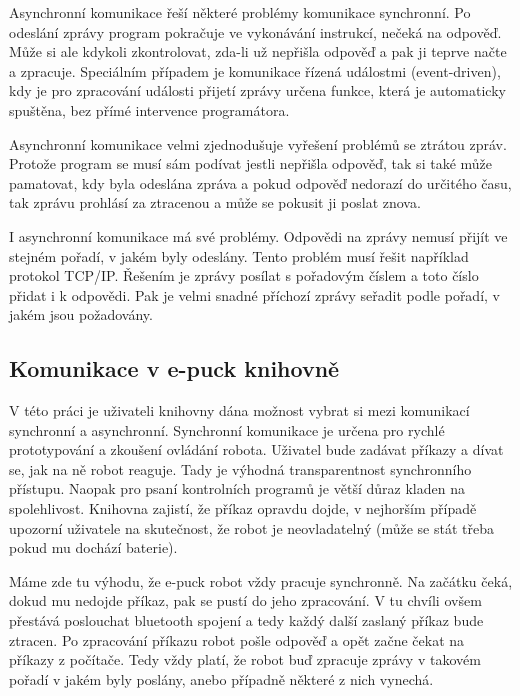 \documentclass[12pt,notitlepage]{report}
\begin{document}
    Asynchronní komunikace řeší některé problémy komunikace synchronní. Po
    odeslání zprávy program pokračuje ve vykonávání instrukcí, nečeká na
    odpověď. Může si ale kdykoli zkontrolovat, zda-li už nepřišla odpověď a pak
    ji teprve načte a zpracuje. Speciálním případem je komunikace řízená
    událostmi (event-driven), kdy je pro zpracování události přijetí zprávy
    určena funkce, která je automaticky spuštěna, bez přímé intervence
    programátora.

    Asynchronní komunikace velmi zjednodušuje vyřešení problémů se ztrátou
    zpráv. Protože program se musí sám podívat jestli nepřišla odpověď, tak si
    také může pamatovat, kdy byla odeslána zpráva a pokud odpověď nedorazí do
    určitého času, tak zprávu prohlásí za ztracenou a může se pokusit ji poslat
    znova.

    I asynchronní komunikace má své problémy. Odpovědi na zprávy nemusí přijít
    ve stejném pořadí, v jakém byly odeslány. Tento problém musí řešit
    například protokol TCP/IP. Řešením je zprávy posílat s pořadovým číslem a
    toto číslo přidat i k odpovědi. Pak je velmi snadné příchozí zprávy seřadit
    podle pořadí, v jakém jsou požadovány.

    \subsection{Komunikace v e-puck knihovně}
    \label{comm-epuck}

    V této práci je uživateli knihovny dána možnost vybrat si mezi komunikací
    synchronní a asynchronní. Synchronní komunikace je určena pro rychlé
    prototypování a zkoušení ovládání robota. Uživatel bude zadávat příkazy a
    dívat se, jak na ně robot reaguje. Tady je výhodná transparentnost
    synchronního přístupu. Naopak pro psaní kontrolních programů je větší důraz
    kladen na spolehlivost. Knihovna zajistí, že příkaz opravdu dojde, v
    nejhorším případě upozorní uživatele na skutečnost, že robot je
    neovladatelný (může se stát třeba pokud mu dochází baterie).

    Máme zde tu výhodu, že e-puck robot vždy pracuje synchronně. Na začátku
    čeká, dokud mu nedojde příkaz, pak se pustí do jeho zpracování. V tu chvíli
    ovšem přestává poslouchat bluetooth spojení a tedy každý další zaslaný
    příkaz bude ztracen. Po zpracování příkazu robot pošle odpověď a opět začne
    čekat na příkazy z počítače. Tedy vždy platí, že robot buď zpracuje zprávy
    v takovém pořadí v jakém byly poslány, anebo případně některé z nich
    vynechá.
\end{document}
